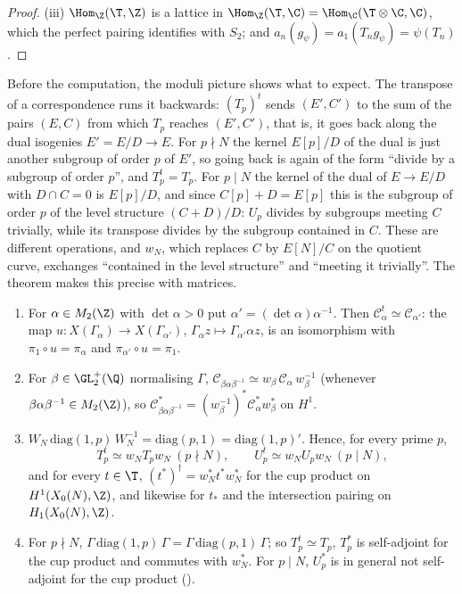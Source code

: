 \begin{proof}
(iii) $\Hom_\Z(\T,\Z)$ is a lattice in $\Hom_\Z(\T,\C)=\Hom_\C(\T\otimes\C,\C)$, which the perfect pairing identifies with $S_2$; and $a_n(g_\psi)=a_1(T_ng_\psi)=\psi(T_n)$.
\end{proof}

Before the computation, the moduli picture shows what to expect. The transpose of a correspondence runs it backwards: $(T_p)^t$ sends $(E',C')$ to the sum of the pairs $(E,C)$ from
which $T_p$ reaches $(E',C')$, that is, it goes back along the dual isogenies $E'=E/D\to E$. For $p\nmid N$ the kernel $E[p]/D$ of the dual is just another subgroup of order $p$ of $E'$,
so going back is again of the form ``divide by a subgroup of order $p$'', and $T_p^t=T_p$. For $p\mid N$ the kernel of the dual of $E\to E/D$ with $D\cap C=0$ is $E[p]/D$, and since
$C[p]+D=E[p]$ this is the subgroup of order $p$ of the level structure $(C+D)/D$: $U_p$ divides by subgroups meeting $C$ trivially, while its transpose divides by the subgroup
contained in $C$. These are different operations, and $w_N$, which replaces $C$ by $E[N]/C$ on the quotient curve, exchanges ``contained in the level structure'' and ``meeting
it trivially''. The theorem makes this precise with matrices.

\begin{theorem}\label{thm:moddeg:transpose}
\leavevmode
\begin{enumerate}[label=(\roman*)]
\item For $\alpha\in M_2(\Z)$ with $\det\alpha>0$ put $\alpha'=(\det\alpha)\alpha^{-1}$. Then $\mathcal C_\alpha^t\simeq\mathcal C_{\alpha'}$: the map $u\colon X(\Gamma_\alpha)\to X(\Gamma_{\alpha'})$,
$\Gamma_\alpha z\mapsto\Gamma_{\alpha'}\alpha z$, is an isomorphism with $\pi_1\circ u=\pi_\alpha$ and $\pi_{\alpha'}\circ u=\pi_1$.
\item For $\beta\in\GL_2^+(\Q)$ normalising $\Gamma$, $\mathcal C_{\beta\alpha\beta^{-1}}\simeq w_\beta\,\mathcal C_\alpha\,w_\beta^{-1}$ (whenever $\beta\alpha\beta^{-1}\in M_2(\Z)$), so
$\mathcal C_{\beta\alpha\beta^{-1}}^*=(w_\beta^{-1})^*\mathcal C_\alpha^*w_\beta^*$ on $H^1$.
\item $W_N\,\mathrm{diag}(1,p)\,W_N^{-1}=\mathrm{diag}(p,1)=\mathrm{diag}(1,p)'$. Hence, for every prime $p$,
\[
T_p^t\simeq w_NT_pw_N\ (p\nmid N),\qquad U_p^t\simeq w_NU_pw_N\ (p\mid N),
\]
and for every $t\in\T$, $(t^*)^\dagger=w_N^*t^*w_N^*$ for the cup product on $H^1(X_0(N),\Z)$, and likewise for $t_*$ and the intersection pairing on $H_1(X_0(N),\Z)$.
\item For $p\nmid N$, $\Gamma\,\mathrm{diag}(1,p)\,\Gamma=\Gamma\,\mathrm{diag}(p,1)\,\Gamma$; so $T_p^t\simeq T_p$, $T_p^*$ is self-adjoint for the cup product and commutes with $w_N^*$. For $p\mid N$,
$U_p^*$ is in general not self-adjoint for the cup product ().
\end{enumerate}
\end{theorem}


